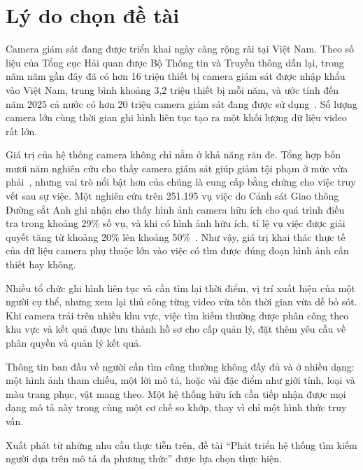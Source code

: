 \section{Lý do chọn đề tài}
\label{sec:1.1}

Camera giám sát đang được triển khai ngày càng rộng rãi tại Việt Nam. Theo số liệu của Tổng cục Hải quan được Bộ Thông tin và Truyền thông dẫn lại, trong năm năm gần đây đã có hơn 16 triệu thiết bị camera giám sát được nhập khẩu vào Việt Nam, trung bình khoảng 3,2 triệu thiết bị mỗi năm, và ước tính đến năm 2025 cả nước có hơn 20 triệu camera giám sát đang được sử dụng~\cite{vnexpress2024camera}. Số lượng camera lớn cùng thời gian ghi hình liên tục tạo ra một khối lượng dữ liệu video rất lớn.

Giá trị của hệ thống camera không chỉ nằm ở khả năng răn đe. Tổng hợp bốn mươi năm nghiên cứu cho thấy camera giám sát giúp giảm tội phạm ở mức vừa phải~\cite{piza2019cctv}, nhưng vai trò nổi bật hơn của chúng là cung cấp bằng chứng cho việc truy vết sau sự việc. Một nghiên cứu trên 251.195 vụ việc do Cảnh sát Giao thông Đường sắt Anh ghi nhận cho thấy hình ảnh camera hữu ích cho quá trình điều tra trong khoảng 29\% số vụ, và khi có hình ảnh hữu ích, tỉ lệ vụ việc được giải quyết tăng từ khoảng 20\% lên khoảng 50\%~\cite{ashby2017cctv}. Như vậy, giá trị khai thác thực tế của dữ liệu camera phụ thuộc lớn vào việc có tìm được đúng đoạn hình ảnh cần thiết hay không.

Nhiều tổ chức ghi hình liên tục và cần tìm lại thời điểm, vị trí xuất hiện của một người cụ thể, nhưng xem lại thủ công từng video vừa tốn thời gian vừa dễ bỏ sót. Khi camera trải trên nhiều khu vực, việc tìm kiếm thường được phân công theo khu vực và kết quả được lưu thành hồ sơ cho cấp quản lý, đặt thêm yêu cầu về phân quyền và quản lý kết quả.

Thông tin ban đầu về người cần tìm cũng thường không đầy đủ và ở nhiều dạng: một hình ảnh tham chiếu, một lời mô tả, hoặc vài đặc điểm như giới tính, loại và màu trang phục, vật mang theo. Một hệ thống hữu ích cần tiếp nhận được mọi dạng mô tả này trong cùng một cơ chế so khớp, thay vì chỉ một hình thức truy vấn.

Xuất phát từ những nhu cầu thực tiễn trên, đề tài ``Phát triển hệ thống tìm kiếm người dựa trên mô tả đa phương thức'' được lựa chọn thực hiện.
